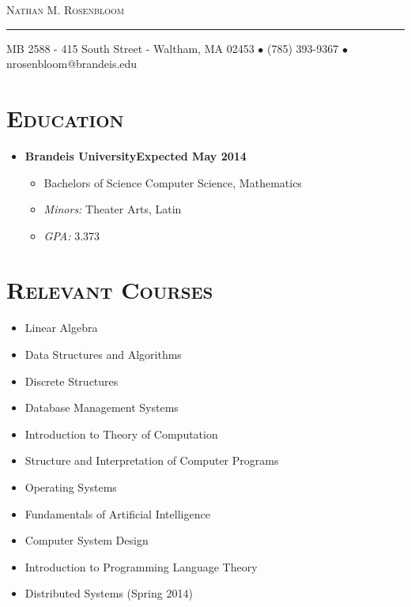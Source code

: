 \documentclass[10pt, oneside]{article}
\makeatletter
\newcommand{\lr}[2]{#1\hfill#2}
\newcommand{\name}{Nathan M. Rosenbloom}
\newcommand{\addr}{MB 2588 - 415 South Street - Waltham, MA 02453}
\newcommand{\phone}{(785) 393-9367}
\newcommand{\email}{nrosenbloom@brandeis.edu}
\newcommand{\resname}[4]{
  \begin{center}
    \selectfont\LARGE\scshape #1
    \normalfont
    \footnotesize
    \itshape
    \rule{\textwidth}{1pt}
    #2 $\bullet$ #3 $\bullet$ #4
    \normalfont
  \end{center}
}
\newcommand{\reseducation}[5]{
  \begin{ressection}{Education}
  \item[] \lr{\bfseries \selectfont #1\normalfont} {Expected #2}
    \vspace{-8pt}
    \begin{itemize} \itemsep-2pt
    \item[] #4
    \item[] \textsl{Minors: }#5
    \item[] \textsl{GPA: }#3
    \end{itemize}
  \end{ressection}
}
\newenvironment{ressection}[1]{
  \section{\normalsize \scshape \selectfont #1 \normalfont}
  \vspace{-4pt}
  \begin{itemize} \itemsep-2pt
  }{
  \end{itemize}
  \vspace{-20pt}
}
\newenvironment{resclasses}
{
  \section{\normalsize \scshape \selectfont Relevant Courses \normalfont}
  \normalfont
  \vspace{-12pt}
  \begin{flushleft}
  \begin{multicols}{3}
    \begin{itemize} \itemsep -3pt
      }{
      \end{itemize}
    \end{multicols}
    \end{flushleft}
  \vspace{-20pt}
}
\makeatother
\begin{document}
\resname{\name}{\addr}{\phone}{\email}
\setcounter{secnumdepth}{-1} %
 
\reseducation{Brandeis University}{May 2014}{3.373}{Bachelors of Science Computer Science, Mathematics}{Theater Arts, Latin}
\begin{resclasses}
\item Linear Algebra
\item Data Structures and Algorithms
\item Discrete Structures
\item Database Management Systems
\item Introduction to Theory of Computation
\item Structure and Interpretation of Computer Programs
\item Operating Systems
\item Fundamentals of Artificial Intelligence
\item Computer System Design
\item Introduction to Programming Language Theory
\item Distributed Systems (Spring 2014)
\end{resclasses}
\end{document}
